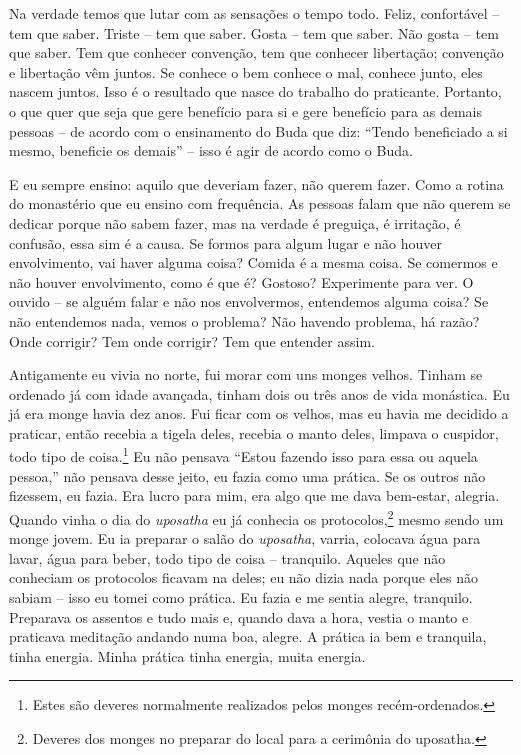 Na verdade temos que lutar com as sensações o tempo todo. Feliz,
confortável – tem que saber. Triste – tem que saber. Gosta – tem que
saber. Não gosta – tem que saber. Tem que conhecer convenção, tem que
conhecer libertação; convenção e libertação vêm juntos. Se conhece o
bem conhece o mal, conhece junto, eles nascem juntos. Isso é o
resultado que nasce do trabalho do praticante. Portanto, o que quer que
seja que gere benefício para si e gere benefício para as demais pessoas
– de acordo com o ensinamento do Buda que diz: “Tendo beneficiado a si
mesmo, beneficie os demais” – isso é agir de acordo como o Buda. 

E eu sempre ensino: aquilo que deveriam fazer, não querem fazer.
Como a rotina do monastério que eu ensino com frequência. As pessoas
falam que não querem se dedicar porque não sabem fazer, mas na verdade
é preguiça, é irritação, é confusão, essa sim é a causa. Se formos para
algum lugar e não houver envolvimento, vai haver alguma coisa? Comida é
a mesma coisa. Se comermos e não houver envolvimento, como é que é?
Gostoso? Experimente para ver. O ouvido – se alguém falar e não nos
envolvermos, entendemos alguma coisa? Se não entendemos nada, vemos o
problema? Não havendo problema, há razão? Onde corrigir? Tem onde
corrigir? Tem que entender assim. 

Antigamente eu vivia no norte, fui morar com uns monges velhos.
Tinham se ordenado já com idade avançada, tinham dois ou três anos de
vida monástica. Eu já era monge havia dez anos. Fui ficar com os
velhos, mas eu havia me decidido a praticar, então recebia a tigela
deles, recebia o manto deles, limpava o cuspidor, todo tipo de
coisa.\footnote{Estes são deveres normalmente realizados pelos monges
recém-ordenados.} Eu não pensava “Estou fazendo isso para essa ou
aquela pessoa,” não pensava desse jeito, eu fazia como uma prática. Se
os outros não fizessem, eu fazia. Era lucro para mim, era algo que me
dava bem-estar, alegria. Quando vinha o dia do \emph{uposatha} eu já
conhecia os protocolos,\footnote{Deveres dos monges no preparar do local
para a cerimônia do uposatha.} mesmo sendo um monge jovem. Eu ia
preparar o salão do \emph{uposatha}, varria, colocava água para
lavar, água para beber, todo tipo de coisa – tranquilo. Aqueles que não
conheciam os protocolos ficavam na deles; eu não dizia nada porque eles
não sabiam – isso eu tomei como prática. Eu fazia e me sentia alegre,
tranquilo. Preparava os assentos e tudo mais e, quando dava a hora,
vestia o manto e praticava meditação andando numa boa, alegre. A
prática ia bem e tranquila, tinha energia. Minha prática tinha energia,
muita energia. 


